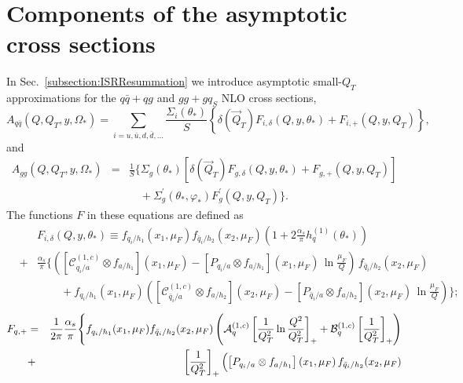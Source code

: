 \documentclass[12pt,english,aps,preprint,prd,letterpaper,fleqn,nofootinbib,showpacs,showkeys,tightenlines,floatfix]{revtex4}
\begin{document}
{\section{Components of the asymptotic cross sections \label{Appendix:Asymptotic}}

In Sec.~\ref{subsection:ISRResummation} we introduce asymptotic
small-$Q_{T}$ approximations for the $q\bar{q}+qg$ and $gg+gq_{S}$
NLO cross sections,\begin{equation}
A_{q\bar{q}}(Q,Q_{T},y,\Omega_{*})=\sum_{i=u,\bar{u},d,\bar{d},...}\frac{\Sigma_{i}(\theta_{*})}{S}\left\{ \delta(\vec{Q}_{T})F_{i,\delta}(Q,y,\theta_{*})+F_{i,+}(Q,y,Q_{T})\right\} ,\label{ASYqqbar2}\end{equation}
 and\begin{eqnarray}
A_{gg}(Q,Q_{T},y,\Omega_{*}) & = & \frac{1}{S}\Biggl\{\Sigma_{g}(\theta_{*})\left[\delta(\vec{Q}_{T})F_{g,\delta}(Q,y,\theta_{*})+F_{g,+}(Q,y,Q_{T})\right]\nonumber \\
 &  & \hspace{12pt}+\Sigma_{g}^{\prime}(\theta_{*},\varphi_{*})F_{g}^{\prime}(Q,y,Q_{T})\Biggr\}.\label{ASYgg2}\end{eqnarray}
 The functions $F$ in these equations are defined as\begin{eqnarray}
 &  & F_{i,\delta}(Q,y,\theta_{*})\equiv f_{q_{i}/h_{1}}(x_{1},\mu_{F})f_{\bar{q}_{i}/h_{2}}(x_{2},\mu_{F})\left(1+2\frac{\alpha_{s}}{\pi}h_{q}^{(1)}(\theta_{*})\right)\nonumber \\
 & + & \frac{\alpha_{s}}{\pi}\Biggl\{\left(\left[\mathcal{C}_{q_{i}/a}^{(1,c)}\otimes f_{a/h_{1}}\right](x_{1},\mu_{F})-\left[P_{q_{i}/a}\otimes f_{a/h_{1}}\right](x_{1},\mu_{F})\,\ln\frac{\mu_{F}}{Q}\right)\, f_{\bar{q}_{i}/h_{2}}(x_{2},\mu_{F})\nonumber \\
 &  & \hspace{26pt}+f_{q_{i}/h_{1}}(x_{1},\mu_{F})\left(\left[\mathcal{C}_{\bar{q}_{i}/a}^{(1,c)}\otimes f_{a/h_{2}}\right](x_{2},\mu_{F})-\left[P_{\bar{q}_{i}/a}\otimes f_{a/h_{2}}\right](x_{2},\mu_{F})\,\ln\frac{\mu_{F}}{Q}\right)\Biggr\};\label{FqDelta}\end{eqnarray}
 \begin{eqnarray}
F_{q,+} & = & \frac{1}{2\pi}\frac{\alpha_{s}}{\pi}\Biggl\{ f_{q_{i}/h_{1}}(x_{1},\mu_{F})f_{\bar{q}_{i}/h_{2}}(x_{2},\mu_{F})\left(\mathcal{A}_{q}^{(1,c)}\left[\frac{1}{Q_{T}^{2}}\ln\frac{Q^{2}}{Q_{T}^{2}}\right]_{+}+\mathcal{B}_{q}^{(1,c)}\left[\frac{1}{Q_{T}^{2}}\right]_{+}\right)\nonumber \\
 & + & \left[\frac{1}{Q_{T}^{2}}\right]_{+}\Bigl(\left[P_{q_{i}/a}\otimes f_{a/h_{1}}\right](x_{1},\mu_{F})\, f_{\bar{q}_{i}/h_{2}}(x_{2},\mu_{F})\nonumber \\

\end{eqnarray}}
\end{document}

